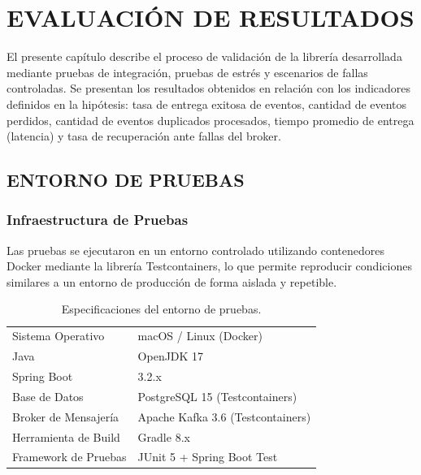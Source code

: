 \clearpage
\chapter{EVALUACIÓN DE RESULTADOS}

El presente capítulo describe el proceso de validación de la librería desarrollada mediante pruebas de integración, pruebas de estrés y escenarios de fallas controladas. Se presentan los resultados obtenidos en relación con los indicadores definidos en la hipótesis: tasa de entrega exitosa de eventos, cantidad de eventos perdidos, cantidad de eventos duplicados procesados, tiempo promedio de entrega (latencia) y tasa de recuperación ante fallas del broker.

\section{ENTORNO DE PRUEBAS}

\subsection{Infraestructura de Pruebas}

Las pruebas se ejecutaron en un entorno controlado utilizando contenedores Docker mediante la librería Testcontainers, lo que permite reproducir condiciones similares a un entorno de producción de forma aislada y repetible.

\begin{table}[H]
    \centering
    \caption{Especificaciones del entorno de pruebas.}
    \small
    \begin{tabularx}{0.92\textwidth}{@{} l Y @{}}
        \toprule
         &  \\
        \midrule
        Sistema Operativo & macOS / Linux (Docker) \\
        Java & OpenJDK 17 \\
        Spring Boot & 3.2.x \\
        Base de Datos & PostgreSQL 15 (Testcontainers) \\
        Broker de Mensajería & Apache Kafka 3.6 (Testcontainers) \\
        Herramienta de Build & Gradle 8.x \\
        Framework de Pruebas & JUnit 5 + Spring Boot Test \\
        \bottomrule
    \end{tabularx}
    \label{tab:entorno_pruebas}
\end{table}

